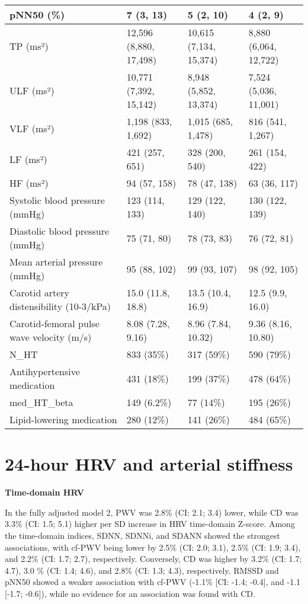 \documentclass[
  a4paper,
  headsepline=true,
  open=any]{scrbook}
\begin{document}
\begin{table}
\begin{tabular}{l|l|l|l}
\hline
pNN50 (\%) & 7 (3, 13) & 5 (2, 10) & 4 (2, 9)\\
\hline
TP (ms²) & 12,596 (8,880, 17,498) & 10,615 (7,134, 15,374) & 8,880 (6,064, 12,722)\\
\hline
ULF (ms²) & 10,771 (7,392, 15,142) & 8,948 (5,852, 13,374) & 7,524 (5,036, 11,001)\\
\hline
VLF (ms²) & 1,198 (833, 1,692) & 1,015 (685, 1,478) & 816 (541, 1,267)\\
\hline
LF (ms²) & 421 (257, 651) & 328 (200, 540) & 261 (154, 422)\\
\hline
HF (ms²) & 94 (57, 158) & 78 (47, 138) & 63 (36, 117)\\
\hline
Systolic blood pressure (mmHg) & 123 (114, 133) & 129 (122, 140) & 130 (122, 139)\\
\hline
Diastolic blood pressure (mmHg) & 75 (71, 80) & 78 (73, 83) & 76 (72, 81)\\
\hline
Mean arterial pressure (mmHg) & 95 (88, 102) & 99 (93, 107) & 98 (92, 105)\\
\hline
Carotid artery distensibility (10-3/kPa) & 15.0 (11.8, 18.8) & 13.5 (10.4, 16.9) & 12.5 (9.9, 16.0)\\
\hline
Carotid-femoral pulse wave velocity (m/s) & 8.08 (7.28, 9.16) & 8.96 (7.84, 10.32) & 9.36 (8.16, 10.80)\\
\hline
N\_HT & 833 (35\%) & 317 (59\%) & 590 (79\%)\\
\hline
Antihypertensive medication & 431 (18\%) & 199 (37\%) & 478 (64\%)\\
\hline
med\_HT\_beta & 149 (6.2\%) & 77 (14\%) & 195 (26\%)\\
\hline
Lipid-lowering medication & 280 (12\%) & 141 (26\%) & 484 (65\%)\\
\hline
\end{tabular}
\end{table}

\hypertarget{hour-hrv-and-arterial-stiffness}{%
\section{24-hour HRV and arterial
stiffness}\label{hour-hrv-and-arterial-stiffness}}

\textbf{Time-domain HRV}

In the fully adjusted model 2, PWV was 2.8\% (CI: 2.1; 3.4) lower, while
CD was 3.3\% (CI: 1.5; 5.1) higher per SD increase in HRV time-domain
Z-score. Among the time-domain indices, SDNN, SDNNi, and SDANN showed
the strongest associations, with cf-PWV being lower by 2.5\% (CI: 2.0;
3.1), 2.5\% (CI: 1.9; 3.4), and 2.2\% (CI: 1.7; 2.7), respectively.
Conversely, CD was higher by 3.2\% (CI: 1.7; 4.7), 3.0 \% (CI: 1.4;
4.6), and 2.8\% (CI: 1.3; 4.3), respectively. RMSSD and pNN50 showed a
weaker association with cf-PWV (-1.1\% {[}CI: -1.4; -0.4{]}, and -1.1
{[}-1.7; -0.6{]}), while no evidence for an association was found with
CD.
\end{document}

